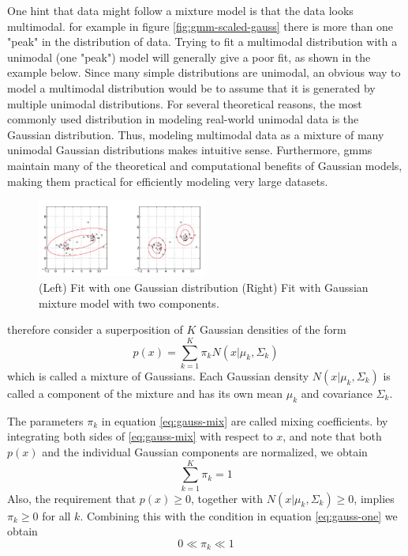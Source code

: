 \documentclass[12pt, a4paper, twoside]{report}
\begin{document}
One hint that data might follow a mixture model is that the data looks multimodal. for example in figure \ref{fig:gmm-scaled-gauss} there is more than one "peak" in the distribution of data. Trying to fit a multimodal distribution with a unimodal (one "peak") model will generally give a poor fit, as shown in the example below. Since many simple distributions are unimodal, an obvious way to model a multimodal distribution would be to assume that it is generated by multiple unimodal distributions. For several theoretical reasons, the most commonly used distribution in modeling real-world unimodal data is the Gaussian distribution. Thus, modeling multimodal data as a mixture of many unimodal Gaussian distributions makes intuitive sense. Furthermore, \acrshort{gmm}s maintain many of the theoretical and computational benefits of Gaussian models, making them practical for efficiently modeling very large datasets.
\begin{figure}[!h]
	\centering
	\includegraphics[width=0.5\textwidth]
	{images/chapter4/gmm-one-mixture}
	\caption{(Left) Fit with one Gaussian distribution (Right) Fit with Gaussian mixture model with two components.}
	\label{fig:gmm-one-mixture}
\end{figure}

therefore consider a superposition of $K$ Gaussian densities of the form
\begin{equation}
p(x) = \sum_{k=1}^{K} \pi_k N(x|\mu_k,\Sigma_k)
\label{eq:gauss-mix}
\end{equation}
which is called a mixture of Gaussians. Each Gaussian density $N(x|\mu_k,\Sigma_k)$ is called a component of the mixture and has its own mean $\mu_k$ and covariance $\Sigma_k$.

The parameters $\pi_k$ in equation \ref{eq:gauss-mix} are called mixing coefficients. by integrating both sides of \ref{eq:gauss-mix} with respect to $x$, and note that both $p(x)$ and the individual Gaussian components are normalized, we obtain
\begin{equation}
\sum_{k=1}^{K} \pi_k = 1
\label{eq:gauss-one}
\end{equation}
Also, the requirement that $p(x) \geq 0$, together with $N(x|\mu_k,\Sigma_k) \geq 0$, implies $\pi_k \geq 0$ for all $k$. Combining this with the condition in equation \ref{eq:gauss-one} we obtain
\begin{equation*}
0 \ll \pi_k \ll 1
\end{equation*}
\end{document}
